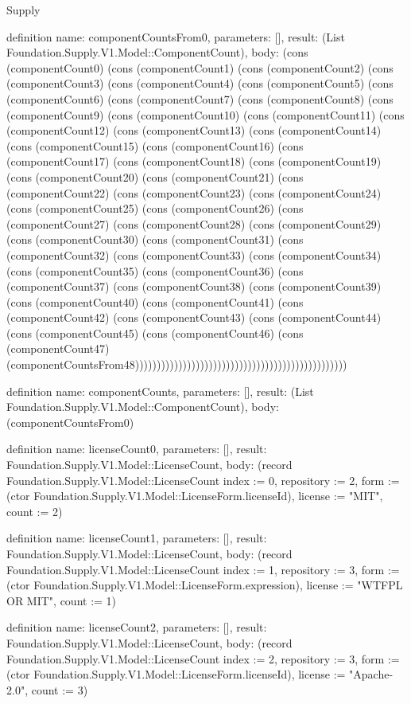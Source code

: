 \begin{lexlean}{Supply}
\begin{semanticmodule}
definition{
  name: componentCountsFrom0,
  parameters: [],
  result: (List Foundation.Supply.V1.Model::ComponentCount),
  body: (cons (componentCount0) (cons (componentCount1) (cons (componentCount2) (cons (componentCount3) (cons (componentCount4) (cons (componentCount5) (cons (componentCount6) (cons (componentCount7) (cons (componentCount8) (cons (componentCount9) (cons (componentCount10) (cons (componentCount11) (cons (componentCount12) (cons (componentCount13) (cons (componentCount14) (cons (componentCount15) (cons (componentCount16) (cons (componentCount17) (cons (componentCount18) (cons (componentCount19) (cons (componentCount20) (cons (componentCount21) (cons (componentCount22) (cons (componentCount23) (cons (componentCount24) (cons (componentCount25) (cons (componentCount26) (cons (componentCount27) (cons (componentCount28) (cons (componentCount29) (cons (componentCount30) (cons (componentCount31) (cons (componentCount32) (cons (componentCount33) (cons (componentCount34) (cons (componentCount35) (cons (componentCount36) (cons (componentCount37) (cons (componentCount38) (cons (componentCount39) (cons (componentCount40) (cons (componentCount41) (cons (componentCount42) (cons (componentCount43) (cons (componentCount44) (cons (componentCount45) (cons (componentCount46) (cons (componentCount47) (componentCountsFrom48)))))))))))))))))))))))))))))))))))))))))))))))))
}

definition{
  name: componentCounts,
  parameters: [],
  result: (List Foundation.Supply.V1.Model::ComponentCount),
  body: (componentCountsFrom0)
}

definition{
  name: licenseCount0,
  parameters: [],
  result: Foundation.Supply.V1.Model::LicenseCount,
  body: (record Foundation.Supply.V1.Model::LicenseCount {index := 0, repository := 2, form := (ctor Foundation.Supply.V1.Model::LicenseForm.licenseId), license := "MIT", count := 2})
}

definition{
  name: licenseCount1,
  parameters: [],
  result: Foundation.Supply.V1.Model::LicenseCount,
  body: (record Foundation.Supply.V1.Model::LicenseCount {index := 1, repository := 3, form := (ctor Foundation.Supply.V1.Model::LicenseForm.expression), license := "WTFPL OR MIT", count := 1})
}

definition{
  name: licenseCount2,
  parameters: [],
  result: Foundation.Supply.V1.Model::LicenseCount,
  body: (record Foundation.Supply.V1.Model::LicenseCount {index := 2, repository := 3, form := (ctor Foundation.Supply.V1.Model::LicenseForm.licenseId), license := "Apache-2.0", count := 3})
}


\end{semanticmodule}
\end{lexlean}
